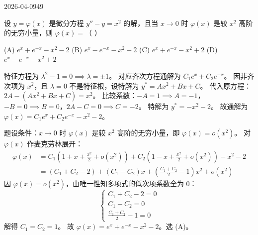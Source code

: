 \begin{mistake}{2026-04-09}{49}

\begin{problemcontent}
设 \( y = \varphi(x) \) 是微分方程 \( y'' - y = x^2 \) 的解，且当 \( x \to 0 \) 时 \( \varphi(x) \) 是较 \( x^2 \) 高阶的无穷小量，则 \( \varphi(x) = \)（ ）

(A) \( e^x + e^{-x} - x^2 - 2 \) (B) \( e^x - e^{-x} - x^2 - 2 \)
(C) \( e^x + e^{-x} - x^2 + 2 \) (D) \( e^x - e^{-x} - x^2 + 2 \)
\end{problemcontent}

\begin{solutioncontent}
特征方程为 \( \lambda^2 - 1 = 0 \implies \lambda = \pm 1 \)。
对应齐次方程通解为 \( C_1 e^x + C_2 e^{-x} \)。
因非齐次项为 \( x^2 \)，且 \( \lambda=0 \) 不是特征根，设特解为 \( y^* = Ax^2 + Bx + C \)。
代入原方程：\( 2A - (Ax^2 + Bx + C) = x^2 \)。
比较系数：\( -A = 1 \implies A = -1 \)，\( -B = 0 \implies B = 0 \)，\( 2A - C = 0 \implies C = -2 \)。
特解为 \( y^* = -x^2 - 2 \)。
故通解为 \( \varphi(x) = C_1 e^x + C_2 e^{-x} - x^2 - 2 \)。

题设条件：\( x \to 0 \) 时 \( \varphi(x) \) 是较 \( x^2 \) 高阶的无穷小量，即 \( \varphi(x) = o(x^2) \)。
对 \( \varphi(x) \) 作麦克劳林展开：
\[
\begin{aligned}
\varphi(x) &= C_1\left(1 + x + \frac{x^2}{2} + o(x^2)\right) + C_2\left(1 - x + \frac{x^2}{2} + o(x^2)\right) - x^2 - 2 \\
&= (C_1 + C_2 - 2) + (C_1 - C_2)x + \left(\frac{C_1+C_2}{2} - 1\right)x^2 + o(x^2)
\end{aligned}
\]
因 \( \varphi(x) = o(x^2) \)，由唯一性知多项式的低次项系数全为 0：
\[
\begin{cases}
C_1 + C_2 - 2 = 0 \\
C_1 - C_2 = 0 \\
\frac{C_1+C_2}{2} - 1 = 0
\end{cases}
\]
解得 \( C_1 = C_2 = 1 \)。
故 \( \varphi(x) = e^x + e^{-x} - x^2 - 2 \)。选 (A)。
\end{solutioncontent}


\end{mistake}
